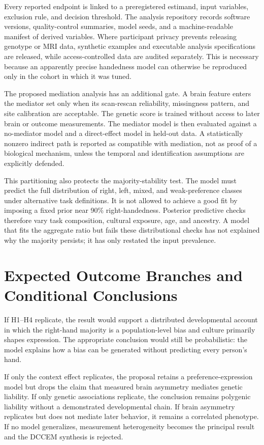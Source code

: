 \documentclass[10pt,conference]{IEEEtran}
\begin{document}
Every reported endpoint is linked to a preregistered estimand, input variables, exclusion rule, and decision threshold. The analysis repository records software versions, quality-control summaries, model seeds, and a machine-readable manifest of derived variables. Where participant privacy prevents releasing genotype or MRI data, synthetic examples and executable analysis specifications are released, while access-controlled data are audited separately. This is necessary because an apparently precise handedness model can otherwise be reproduced only in the cohort in which it was tuned.

The proposed mediation analysis has an additional gate. A brain feature enters the mediator set only when its scan-rescan reliability, missingness pattern, and site calibration are acceptable. The genetic score is trained without access to later brain or outcome measurements. The mediator model is then evaluated against a no-mediator model and a direct-effect model in held-out data. A statistically nonzero indirect path is reported as compatible with mediation, not as proof of a biological mechanism, unless the temporal and identification assumptions are explicitly defended.

This partitioning also protects the majority-stability test. The model must predict the full distribution of right, left, mixed, and weak-preference classes under alternative task definitions. It is not allowed to achieve a good fit by imposing a fixed prior near 90\% right-handedness. Posterior predictive checks therefore vary task composition, cultural exposure, age, and ancestry. A model that fits the aggregate ratio but fails these distributional checks has not explained why the majority persists; it has only restated the input prevalence.

\section{Expected Outcome Branches and Conditional Conclusions}
If H1--H4 replicate, the result would support a distributed developmental account in which the right-hand majority is a population-level bias and culture primarily shapes expression. The appropriate conclusion would still be probabilistic: the model explains how a bias can be generated without predicting every person's hand.

If only the context effect replicates, the proposal retains a preference-expression model but drops the claim that measured brain asymmetry mediates genetic liability. If only genetic associations replicate, the conclusion remains polygenic liability without a demonstrated developmental chain. If brain asymmetry replicates but does not mediate later behavior, it remains a correlated phenotype. If no model generalizes, measurement heterogeneity becomes the principal result and the DCCEM synthesis is rejected.
\end{document}
